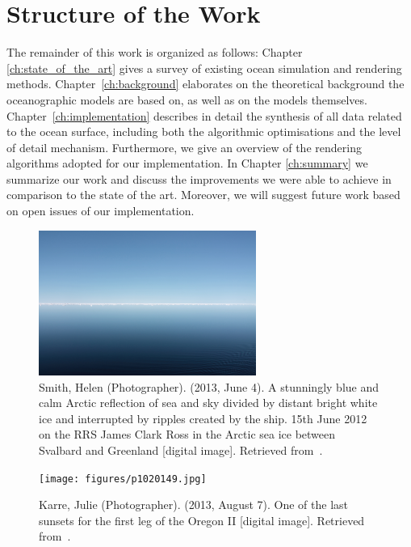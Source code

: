 \section{Structure of the Work}
\label{sec:structure}
The remainder of this work is organized as follows: Chapter
\ref{ch:state_of_the_art} gives a survey of existing ocean simulation and
rendering methods. Chapter~\ref{ch:background} elaborates on the theoretical
background the oceanographic models are based on, as well as on the models
themselves. Chapter~\ref{ch:implementation} describes in detail the
synthesis of all data related to the ocean surface, including both the algorithmic
optimisations and the level of detail mechanism. Furthermore, we give an overview
of the rendering algorithms adopted for our implementation. In Chapter
\ref{ch:summary} we summarize our work and discuss the improvements we were able
to achieve in comparison to the state of the art. Moreover, we will suggest
future work based on open issues of our implementation.
%
%
\begin{figure}
\centering
\includegraphics[width=0.635\textwidth]{figures/helen-smith-arcticsea.jpg}
\caption{
	Smith, Helen (Photographer).
	(2013, June 4).
	A stunningly blue and calm Arctic reflection of sea and sky divided by distant
	bright white ice and interrupted by ripples created by the ship. 15th June
	2012 on the RRS James Clark Ross in the Arctic sea ice between Svalbard and
	Greenland [digital image].
	Retrieved from~\citet{misc:noaa:arctic}.
	}
\label{fig:ocean:arctic}
\end{figure}
\begin{figure}
\centering
\texttt{[image: figures/p1020149.jpg]}
\caption{
	Karre, Julie (Photographer).
	(2013, August 7).
	One of the last sunsets for the first leg of the Oregon II [digital image].
	Retrieved from~\citet{misc:noaa:sunset}.
	}
\label{fig:ocean:sunset}
\end{figure}

